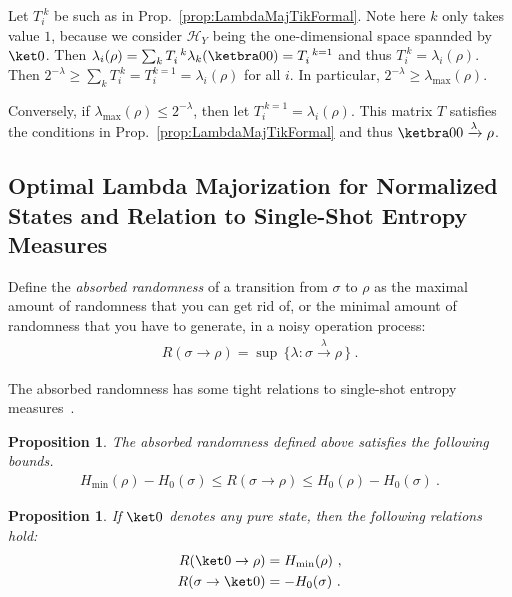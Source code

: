 \documentclass[10pt,letterpaper]{article}
\theoremstyle{plain}
\newtheorem{prop}[thm]{Proposition}
\def\Hs{\mathscr{H}}%
\def\HH{{H}}%
\def\Hmin{\HH_\mathrm{min}}
\def\Hzero{\HH_0}
\newenvironment{myproof}[1][\proofname]{%
  \color{prooftextcolor} \footnotesize \proof[\itshape #1]\hspace*{1.2mm}%
}{\endproof}
\newcommand{\lambdamaj}[1]{\xrightarrow{#1}}
\begin{document}
\begin{myproof}[Proof of Prop.~\ref{prop:LambdaMajorizedDOpsByPureState}]
  Let $T_i^{~k}$ be such as in Prop.~\ref{prop:LambdaMajTikFormal}. Note here $k$ only takes value
  $1$, because we consider $\Hs_Y$ being the one-dimensional space spannded by $\ket0$. Then
  $\lambda_i(\rho) = \sum_k T_i^{~k} \lambda_k(\ketbra00) = T_i^{~k=1}$ and thus
  $T_i^{~k}=\lambda_i(\rho)$. Then $2^{-\lambda} \geqslant \sum_k T_i^{~k} = T_i^{k=1} = \lambda_i(\rho)$ for
  all $i$. In particular, $2^{-\lambda}\geqslant \lambda_\mathrm{max}(\rho)$.

  Conversely, if $\lambda_\mathrm{max}(\rho) \leqslant 2^{-\lambda}$, then let $T_i^{~k=1}=\lambda_i(\rho)$. This
  matrix $T$ satisfies the conditions in Prop.~\ref{prop:LambdaMajTikFormal} and thus
  $\ketbra00\lambdamaj\lambda\rho$.
\end{myproof}


\subsection{Optimal Lambda Majorization for Normalized States and Relation to Single-Shot Entropy Measures}

Define the {\em absorbed randomness} of a transition from $\sigma$ to $\rho$ as the maximal amount of randomness
that you can get rid of, or the minimal amount of randomness that you have to generate, in a noisy operation
process:
\begin{align}
  \label{eq:AbsorbedRandomnessDef}
  R(\sigma\rightarrow\rho) = \sup\, \bigl\{ \lambda : \sigma \lambdamaj{\lambda} \rho \, \bigr\}\ .
\end{align}

The absorbed randomness has some tight relations to single-shot entropy measures~\cite{PhdRenner2005_SQKD}.

\begin{prop}
  \label{prop:RBoundsHminmax}
  The absorbed randomness defined above satisfies the following bounds.
  \begin{align*}
    \Hmin(\rho)-\Hzero(\sigma) \leqslant R(\sigma\rightarrow\rho) \leqslant \Hzero(\rho) - \Hzero(\sigma) \ .
  \end{align*}
\end{prop}

\begin{prop}
  \label{prop:RpurerhoAndRsigmapure}
  If $\ket0$ denotes any pure state, then the following relations hold:
  \begin{align}
    \label{eq:Rpurerho}  R(\ket 0 \rightarrow \rho) &= \Hmin(\rho)\ ,\\
    \label{eq:Rsigmapure}  R(\sigma \rightarrow \ket 0) &= -\Hzero(\sigma)\ .
  \end{align}
\end{prop}
\end{document}
